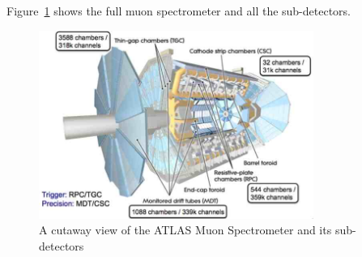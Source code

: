\par Figure~\ref{fig:fullMu} shows the full muon spectrometer and all the sub-detectors. 

\begin{figure}
	\centering
   \includegraphics[width=0.8\textwidth]{figures/muSpecWhole.png}
	\caption{A cutaway view of the ATLAS Muon Spectrometer and its sub-detectors}
	\label{fig:fullMu}
\end{figure}
